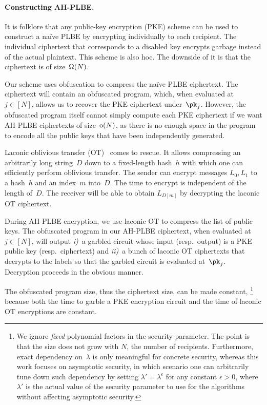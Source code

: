 \paragraph{Constructing AH-PLBE.}
It is folklore that any public-key encryption (PKE) scheme can be used to construct a na{\"i}ve PLBE by encrypting individually to each recipient.
The individual ciphertext that corresponds to a disabled key encrypts garbage instead of the actual plaintext.
This scheme is also \ad hoc.
The downside of it is that the ciphertext is of size~$\operatorname{\Omega}(N)$.

Our scheme uses obfuscation to compress the na{\"i}ve PLBE ciphertext.
The ciphertext will contain an obfuscated program, which, when evaluated at~${j\in[N]}$, allows us to recover the PKE ciphertext under~$\pk_j$.
However, the obfuscated program itself cannot simply compute each PKE ciphertext if we want AH-PLBE ciphertexts of size~$\operatorname{o}(N)$, as there is no enough space in the program to encode all the public keys that have been independently generated.

Laconic oblivious transfer (OT)~\cite{C:CDGGMP17} comes to rescue.
It allows compressing an arbitrarily long string~$D$ down to a fixed-length hash~$h$ with which one can efficiently perform oblivious transfer.
The sender can encrypt messages $L_0,L_1$ to a hash~$h$ and an index~$m$ into~$D$.
The time to encrypt is independent of the length of~$D$.
The receiver will be able to obtain $L_{D[m]}$ by decrypting the laconic OT ciphertext.

During AH-PLBE encryption, we use laconic OT to compress the list of public keys.
The obfuscated program in our AH-PLBE ciphertext, when evaluated at~${j\in[N]}$, will output
\emph{i)}~a garbled circuit whose input (resp.~output) is a PKE public key (resp.~ciphertext) and
\emph{ii)}~a bunch of laconic OT ciphertexts that decrypts to the labels so that the garbled circuit is evaluated at~$\pk_j$.
Decryption proceeds in the obvious manner.

The obfuscated program size, thus the ciphertext size, can be made constant,%
\footnote{\label{fn:ignore-poly-lambda}%
We ignore \emph{fixed} polynomial factors in the security parameter.
The point is that the size does not grow with $N$, the number of recipients.
Furthermore, exact dependency on~$\lambda$ is
only meaningful for concrete security,
whereas this work focuses on asymptotic security,
in which scenario one can arbitrarily tune down such dependency by setting
${\lambda'=\lambda^\epsilon}$ for any constant ${\epsilon>0}$,
where $\lambda'$ is the actual value of the security parameter
to use for the algorithms without affecting asymptotic security.}
because
both the time to garble a PKE encryption circuit and the time of laconic OT encryptions are constant.
